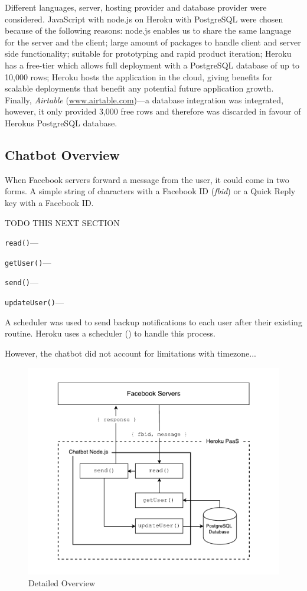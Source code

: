 Different languages, server, hosting provider and database provider were considered. JavaScript with node.js on Heroku with PostgreSQL were chosen because of the following reasons: node.js enables us to share the same language for the server and the client; large amount of packages to handle client and server side functionality; suitable for prototyping and rapid product iteration; Heroku has a free-tier which allows full deployment with a PostgreSQL database of up to 10,000 rows; Heroku hosts the application in the cloud, giving benefits for scalable deployments that benefit any potential future application growth. Finally, \textit{Airtable} (\url{www.airtable.com})---a database integration was integrated, however, it only provided 3,000 free rows and therefore was discarded in favour of Herokus PostgreSQL database.

\subsection*{Chatbot Overview}
When Facebook servers forward a message from the user, it could come in two forms. A simple string of characters with a Facebook ID (\textit{fbid}) or a Quick Reply key with a Facebook ID.

TODO THIS NEXT SECTION

\verb|read()|---


\verb|getUser()|---


\verb|send()|---


\verb|updateUser()|---


A scheduler was used to send backup notifications to each user after their existing routine. Heroku uses a scheduler (\url{}) to handle this process.


However, the chatbot did not account for limitations with timezone...\newline


\begin{figure}[H]
    \centering
    \includegraphics[width=6in]{../resources/diagrams/chatbot-detailed-overview.pdf}
    \caption{Detailed Overview}
    \label{fig:prototype_detailed_overview}
\end{figure}


